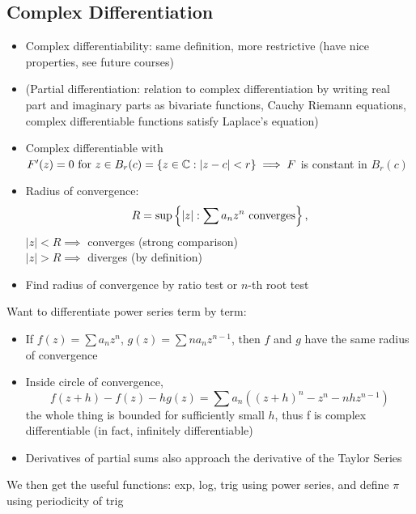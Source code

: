 \subsection*{Complex Differentiation}
\begin{itemize}
      \item Complex differentiability: same definition, more restrictive (have nice properties, see future courses)
      \item (Partial differentiation: relation to complex differentiation by writing real part and imaginary parts as bivariate functions, Cauchy Riemann equations, complex differentiable functions satisfy Laplace's equation)
      \item Complex differentiable with $F'(z) = 0 \text{ for } z \in B_r(c) = \{z \in \mathbb{C} :|z-c| < r\} \\ \implies F$ is constant in $B_r(c)$
      \item Radius of convergence: \[R= \sup \left\{ \left| z \right|:\sum a_n z^n \text{ converges} \right\},\]
            $|z|<R \implies $ converges (strong comparison)\\
            $|z|>R \implies $ diverges (by definition)
      \item Find radius of convergence by ratio test or $n$-th root test
\end{itemize}
Want to differentiate power series term by term:
\begin{itemize}
      \item If $f(z) = \sum a_n z^n$, $g(z) = \sum n a_n z^{n-1}$, then $f$ and $g$ have the same radius of convergence
      \item Inside circle of convergence, \[f(z+h)-f(z)-hg(z) = \sum a_n((z+h)^n-z^n-nhz^{n-1})\] the whole thing is bounded for sufficiently small $h$, thus f is complex differentiable (in fact, infinitely differentiable)
      \item Derivatives of partial sums also approach the derivative of the Taylor Series
\end{itemize}
We then get the useful functions: exp, log, trig using power series, and define $\pi$ using periodicity of trig

